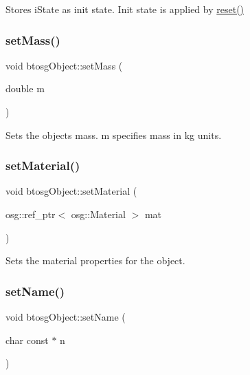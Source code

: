 Stores i\+State as init state. Init state is applied by \mbox{\hyperlink{classbtosgObject_a93983f9180dd0672f8779cf2baa78580}{reset()}} \mbox{\label{classbtosgObject_a91da93c82d48b86192f0cbb16054fe57}} 
\subsubsection{\texorpdfstring{setMass()}{setMass()}}
{\footnotesize\ttfamily void btosg\+Object\+::set\+Mass (\begin{DoxyParamCaption}\item[{double}]{m }\end{DoxyParamCaption})\hspace{0.3cm}{\ttfamily [inline]}}

Sets the object\textquotesingle{}s mass. m specifies mass in kg units. \mbox{\label{classbtosgObject_a6ab7b9e0553dab398b980637788b56a8}} 
\subsubsection{\texorpdfstring{setMaterial()}{setMaterial()}}
{\footnotesize\ttfamily void btosg\+Object\+::set\+Material (\begin{DoxyParamCaption}\item[{osg\+::ref\+\_\+ptr$<$ osg\+::\+Material $>$}]{mat }\end{DoxyParamCaption})\hspace{0.3cm}{\ttfamily [inline]}}

Sets the material properties for the object. \mbox{\label{classbtosgObject_ab06a1b3f357209214c6440cd5746523e}} 
\subsubsection{\texorpdfstring{setName()}{setName()}}
{\footnotesize\ttfamily void btosg\+Object\+::set\+Name (\begin{DoxyParamCaption}\item[{char const $\ast$}]{n }\end{DoxyParamCaption})\hspace{0.3cm}{\ttfamily [inline]}}

